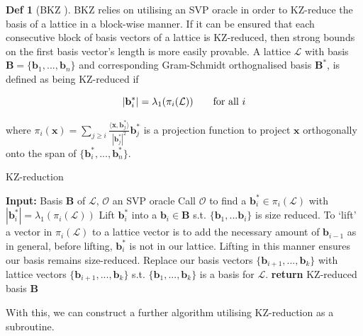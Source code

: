 \documentclass[a4paper, 10pt]{article}
\theoremstyle{definition}
\newtheorem{definition}{Def}[section]
\begin{document}
\begin{definition}[\ac{BKZ} \cite{10.1007/3-540-54458-5_51}]
    \ac{BKZ} relies on utilising an \ac{SVP} oracle in order to KZ-reduce the basis of a lattice in a block-wise manner. If it can be ensured that each consecutive block of basis vectors of a lattice is KZ-reduced, then strong bounds on the first basis vector's length is more easily provable. A lattice $\mathcal{L} $ with basis $\mathbf{B}=\{\mathbf{b}_1, ..., \mathbf{b}_n\}$ and corresponding Gram-Schmidt orthognalised basis $\mathbf{B}^*$, is defined as being KZ-reduced if
    
    \[|\mathbf{b}_i^*| = \lambda_1(\pi_i(\mathcal{L})) \mbox{\qquad for all $i$}\]
    
    where $\pi_i(\mathbf{x})=\sum_{j \geq i} \frac{\langle \mathbf{x}, \mathbf{b}_j^*\rangle}{|\mathbf{b}^*_j|^2}\mathbf{b}^*_j$ is a projection function to project $\mathbf{x}$ orthogonally onto the span of $\{\mathbf{b}_i^*, ..., \mathbf{b}_n^*\}$.

    \begin{algorithm}[H]
        \caption{KZ-reduction}\label{alg:KZ}
        \begin{algorithmic}[1]
        \State \textbf{Input:} Basis $\mathbf{B}$ of $\mathcal{L}$, $\mathcal{O}$ an \ac{SVP} oracle
            \State Call $\mathcal{O}$ to find a $\mathbf{b}_i^*\in \pi_i(\mathcal{L})$ with $|\mathbf{b}_i^*|=\lambda_1(\pi_i(\mathcal{L}))$
            \State Lift  $\mathbf{b}_i^*$ into a $\mathbf{b}_i \in \mathbf{B}$ s.t. $\{\mathbf{b}_1,...\mathbf{b}_i\}$ is size reduced. \Comment To `lift' a vector in $\pi_i(\mathcal{L})$ to a lattice vector is to add the necessary amount of $\mathbf{b}_{i-1}$ as in general, before lifting, $\mathbf{b}_i^*$ is not in our lattice. Lifting in this manner ensures our basis remains size-reduced.
            \State Replace our basis vectors $\{\mathbf{b}_{i+1}, ..., \mathbf{b}_k\}$ with lattice vectors $\{\mathbf{b}_{i+1},...,\mathbf{b}_k\}$ s.t. $\{\mathbf{b}_1,...,\mathbf{b}_k\}$ is a basis for $\mathcal{L}$.
        \EndFor
        \State \textbf{return} KZ-reduced basis $\mathbf{B}$
        \end{algorithmic}
    \end{algorithm}

    With this, we can construct a further algorithm utilising KZ-reduction as a subroutine.


\end{definition}
\end{document}
